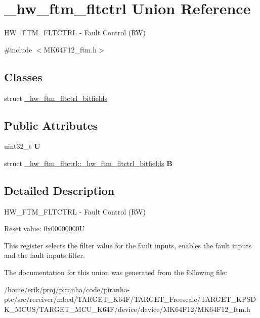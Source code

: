 \hypertarget{union__hw__ftm__fltctrl}{}\section{\+\_\+hw\+\_\+ftm\+\_\+fltctrl Union Reference}
\label{union__hw__ftm__fltctrl}


H\+W\+\_\+\+F\+T\+M\+\_\+\+F\+L\+T\+C\+T\+RL -\/ Fault Control (RW)  




{\ttfamily \#include $<$M\+K64\+F12\+\_\+ftm.\+h$>$}

\subsection*{Classes}
\begin{DoxyCompactItemize}
\item 
struct \hyperlink{struct__hw__ftm__fltctrl_1_1__hw__ftm__fltctrl__bitfields}{\+\_\+hw\+\_\+ftm\+\_\+fltctrl\+\_\+bitfields}
\end{DoxyCompactItemize}
\subsection*{Public Attributes}
\begin{DoxyCompactItemize}
\item 
uint32\+\_\+t {\bfseries U}\hypertarget{union__hw__ftm__fltctrl_ac74409c94377b6fa667eab15c80a253a}{}\label{union__hw__ftm__fltctrl_ac74409c94377b6fa667eab15c80a253a}

\item 
struct \hyperlink{struct__hw__ftm__fltctrl_1_1__hw__ftm__fltctrl__bitfields}{\+\_\+hw\+\_\+ftm\+\_\+fltctrl\+::\+\_\+hw\+\_\+ftm\+\_\+fltctrl\+\_\+bitfields} {\bfseries B}\hypertarget{union__hw__ftm__fltctrl_a42f992ecd9efb75f5f0100d23001023a}{}\label{union__hw__ftm__fltctrl_a42f992ecd9efb75f5f0100d23001023a}

\end{DoxyCompactItemize}


\subsection{Detailed Description}
H\+W\+\_\+\+F\+T\+M\+\_\+\+F\+L\+T\+C\+T\+RL -\/ Fault Control (RW) 

Reset value\+: 0x00000000U

This register selects the filter value for the fault inputs, enables the fault inputs and the fault inputs filter. 

The documentation for this union was generated from the following file\+:\begin{DoxyCompactItemize}
\item 
/home/erik/proj/piranha/code/piranha-\/ptc/src/receiver/mbed/\+T\+A\+R\+G\+E\+T\+\_\+\+K64\+F/\+T\+A\+R\+G\+E\+T\+\_\+\+Freescale/\+T\+A\+R\+G\+E\+T\+\_\+\+K\+P\+S\+D\+K\+\_\+\+M\+C\+U\+S/\+T\+A\+R\+G\+E\+T\+\_\+\+M\+C\+U\+\_\+\+K64\+F/device/device/\+M\+K64\+F12/M\+K64\+F12\+\_\+ftm.\+h\end{DoxyCompactItemize}
